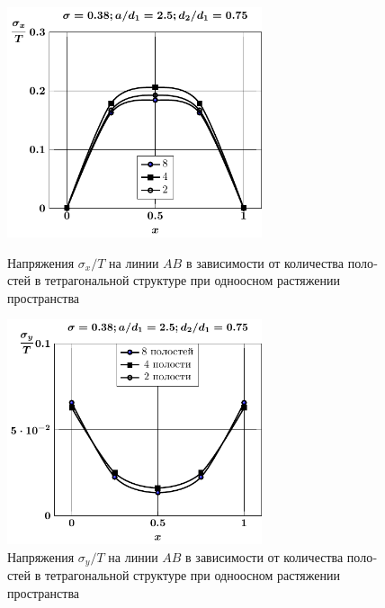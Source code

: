 \begin{russian}
\begin{figure}[h!]
\centering\footnotesize
\parbox[b]{7.5cm}{\centering\includegraphics[width=7.5cm]{cav8-4-2-sig_x-spheroids.pdf}
\caption{Напряжения $\sigma_x/T$ на линии $AB$ в зависимости от количества полостей в тетрагональной структуре при одноосном растяжении пространства
\label{f:9:2}}}\hfil\hfil
\parbox[b]{7.5cm}{\centering\includegraphics[width=7.5cm]{cav8-4-2-sig_y-spheroids.pdf}
\caption{Напряжения $\sigma_y/T$ на линии $AB$ в зависимости от количества полостей в тетрагональной структуре при одноосном растяжении пространства
\label{f:9:3}}}
\end{figure}

%


\end{russian}
